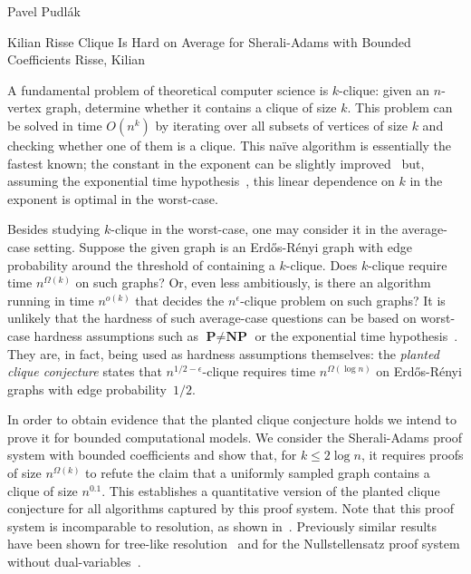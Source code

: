 \documentclass[report]{owrart}
\begin{document}
\begin{report}
\begin{talk}{Pavel Pudl\'ak}
\end{talk}


  \begin{talk}{Kilian Risse}
    {Clique Is Hard on Average for Sherali-Adams with Bounded
    Coefficients}
    {Risse, Kilian}
    
    \noindent
    A fundamental problem of theoretical computer science is $k$-clique:
  given an $n$-vertex graph, determine whether it contains a clique of
  size $k$. This problem can be solved in time $O(n^k)$ by iterating
  over all subsets of vertices of size $k$ and checking whether one of
  them is a clique. This naïve algorithm is essentially the fastest
  known; the constant in the exponent can be slightly
  improved~\cite{NP85CplxSubgraph} but, assuming the exponential time
  hypothesis~\cite{CHKX04LinearFPTreductions}, this linear dependence on
  $k$ in the exponent is optimal in the worst-case.
  
  Besides studying $k$-clique in the worst-case, one may consider it in
  the average-case setting. Suppose the given graph is an
  Erd\H{o}s-Rényi graph with edge probability around the threshold of
  containing a $k$-clique. Does $k$-clique require time $n^{\Omega(k)}$
  on such graphs? Or, even less ambitiously, is there an algorithm
  running in time $n^{o(k)}$ that decides the $n^\epsilon$-clique problem on
  such graphs?  It is unlikely that the hardness of such average-case
  questions can be based on worst-case hardness assumptions such as
  $\textbf{P} \neq \textbf{NP}$ or the exponential time
  hypothesis~\cite{BT06}. They are, in fact, being used as hardness
  assumptions themselves: the \emph{planted clique conjecture} states
  that $n^{1/2-\epsilon}$-clique requires time $n^{\Omega(\log n)}$ on
  Erd\H{o}s-Rényi graphs with edge probability~$1/2$.
  
  In order to obtain evidence that the planted clique conjecture holds
  we intend to prove it for bounded computational models. We consider
  the Sherali-Adams proof system with bounded coefficients and show
  that, for $k \leq 2 \log n$, it requires proofs of size
  $n^{\Omega(k)}$ to refute the claim that a uniformly sampled graph
  contains a clique of size $n^{0.1}$. This establishes a quantitative
  version of the planted clique conjecture for all algorithms captured
  by this proof system. Note that this proof system is incomparable to
  resolution, as shown in~\cite{GHJMPRT22}. Previously similar results
  have been shown for tree-like
  resolution~\cite{BGLR12Parameterized,Lauria18} and for the
  Nullstellensatz proof system without
  dual-variables~\cite{Margulies08Thesis}.
  

\end{talk}
\end{report}
\end{document}

